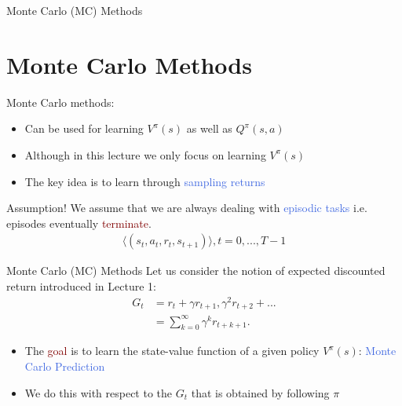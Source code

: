 \documentclass{beamer}
\begin{document}
\begin{frame}{Monte Carlo (MC) Methods}
	\section{Monte Carlo Methods}
		Monte Carlo methods:
		\begin{itemize}
			\item Can be used for learning $V^\pi(s)$ as well as $Q^\pi(s,a)$ 
			\item Although in this lecture we only focus on learning $V^\pi(s)$
			\item The key idea is to learn through \textcolor{RoyalBlue}{sampling returns}
		\end{itemize}

	\begin{block}{Assumption!}
		We assume that we are always dealing with \textcolor{RoyalBlue}{episodic tasks} i.e. episodes eventually \textcolor{Maroon}{terminate}.
		\begin{align*}
			\langle(s_t,a_t,r_t,s_{t+1})\rangle, t=0,..., T-1
		\end{align*}
	\end{block}
\end{frame}

\begin{frame}{Monte Carlo (MC) Methods}
	Let us consider the notion of expected discounted return introduced in Lecture 1:
	\begin{align*}
		G_t & = r_t+\gamma r_{t+1}, \gamma^{2} r_{t+2} + ... \\
			& = \sum_{k=0}^{\infty}\gamma^{k} r_{t+k+1}.	
	\end{align*}

	\begin{itemize}
		\item The \textcolor{Maroon}{goal} is to learn the state-value function of a given policy $V^\pi(s)$: \textcolor{RoyalBlue}{Monte Carlo Prediction} 
		\item We do this with respect to the $G_t$ that is obtained by following $\pi$
	\end{itemize}
\end{frame}
\end{document}
